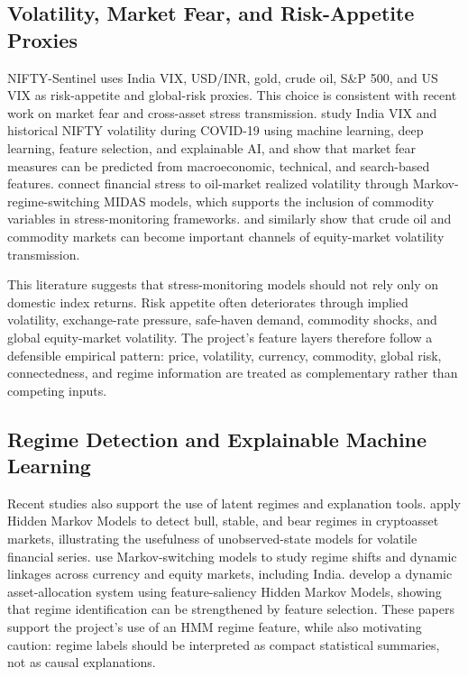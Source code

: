 \documentclass[12pt,a4paper]{article}
\begin{document}
\subsection{Volatility, Market Fear, and Risk-Appetite Proxies}

NIFTY-Sentinel uses India VIX, USD/INR, gold, crude oil, S\&P 500, and US VIX as risk-appetite and global-risk proxies. This choice is consistent with recent work on market fear and cross-asset stress transmission. \citet{marketfear2021india} study India VIX and historical NIFTY volatility during COVID-19 using machine learning, deep learning, feature selection, and explainable AI, and show that market fear measures can be predicted from macroeconomic, technical, and search-based features. \citet{panga2021oilfsi} connect financial stress to oil-market realized volatility through Markov-regime-switching MIDAS models, which supports the inclusion of commodity variables in stress-monitoring frameworks. \citet{zhang2021oilstock} and \citet{eap2023indiaCommodity} similarly show that crude oil and commodity markets can become important channels of equity-market volatility transmission.

This literature suggests that stress-monitoring models should not rely only on domestic index returns. Risk appetite often deteriorates through implied volatility, exchange-rate pressure, safe-haven demand, commodity shocks, and global equity-market volatility. The project's feature layers therefore follow a defensible empirical pattern: price, volatility, currency, commodity, global risk, connectedness, and regime information are treated as complementary rather than competing inputs.

\subsection{Regime Detection and Explainable Machine Learning}

Recent studies also support the use of latent regimes and explanation tools. \citet{giudici2020hmm} apply Hidden Markov Models to detect bull, stable, and bear regimes in cryptoasset markets, illustrating the usefulness of unobserved-state models for volatile financial series. \citet{dua2021regime} use Markov-switching models to study regime shifts and dynamic linkages across currency and equity markets, including India. \citet{fons2020hmm} develop a dynamic asset-allocation system using feature-saliency Hidden Markov Models, showing that regime identification can be strengthened by feature selection. These papers support the project's use of an HMM regime feature, while also motivating caution: regime labels should be interpreted as compact statistical summaries, not as causal explanations.
\end{document}
